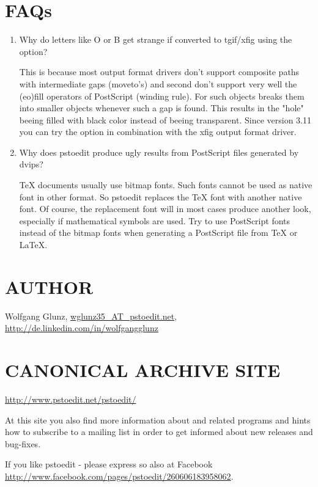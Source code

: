 \documentclass[english,a4paper]{article}
\let\URL\url \let\Email\url \let\File\url
\begin{document}
\section{FAQs}

\begin{enumerate}
\item Why do letters like O or B get strange if converted to tgif/xfig
using the  option?

This is because most output format drivers don't support composite paths with
intermediate gaps (moveto's) and second don't support very well the (eo)fill
operators of PostScript (winding rule). For such objects  breaks
them into smaller objects whenever such a gap is found. This results in the
"hole" beeing filled with black color instead of beeing transparent. Since
version 3.11 you can try the  option in combination with the xfig
output format driver.


\item Why does pstoedit produce ugly results from PostScript files generated
by dvips?

TeX documents usually use bitmap fonts. Such fonts cannot be used as native
font in other format. So pstoedit replaces the TeX font with another native
font. Of course, the replacement font will in most cases produce another
look, especially if mathematical symbols are used.
Try to use PostScript fonts instead of the bitmap fonts when generating a PostScript file from TeX or LaTeX.


\end{enumerate}

\section{AUTHOR}

Wolfgang Glunz, \Email{wglunz35_AT_pstoedit.net}, \URL{http://de.linkedin.com/in/wolfgangglunz}


\section{CANONICAL ARCHIVE SITE}

\URL{http://www.pstoedit.net/pstoedit/}

At this site you also find more information about  and related
programs and hints how to subscribe to a mailing list in order to get informed
about new releases and bug-fixes.

If you like pstoedit - please express so also at Facebook \URL{http://www.facebook.com/pages/pstoedit/260606183958062}.
\end{document}
